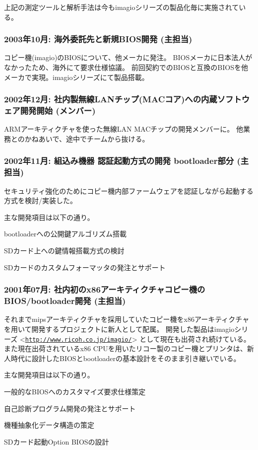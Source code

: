 \documentclass[letterpaper]{article}
\renewenvironment{itemize}{
  \begin{list}{}{
    \setlength{\leftmargin}{1.5em}
  }
}{
  \end{list}
}
\begin{document}
上記の測定ツールと解析手法は今もimagioシリーズの製品化毎に実施されている。

\subsubsection*{2003年10月: 海外委託先と新規BIOS開発 (主担当)}
コピー機(imagio)のBIOSについて、他メーカに発注。
BIOSメーカに日本法人がなかったため、海外にて要求仕様協議。
前回契約でのBIOSと互換のBIOSを他メーカで実現。imagioシリーズにて製品搭載。

\subsubsection*{2002年12月: 社内製無線LANチップ(MACコア)への内蔵ソフトウェア開発開始 (メンバー)}
ARMアーキティクチャを使った無線LAN MACチップの開発メンバーに。
他業務とのかねあいで、途中でチームから抜ける。

\subsubsection*{2002年11月: 組込み機器 認証起動方式の開発 bootloader部分 (主担当)}
セキュリティ強化のためにコピー機内部ファームウェアを認証しながら起動する方式を検討/実装した。

主な開発項目は以下の通り。
\begin{itemize}
  \item bootloaderへの公開鍵アルゴリズム搭載
  \item SDカード上への鍵情報搭載方式の検討
  \item SDカードのカスタムフォーマッタの発注とサポート
\end{itemize}

\subsubsection*{2001年07月: 社内初のx86アーキティクチャコピー機のBIOS/bootloader開発 (主担当)}
それまでmipsアーキティクチャを採用していたコピー機をx86アーキティクチャを用いて開発するプロジェクトに新人として配属。
開発した製品はimagioシリーズ <\href{http://www.ricoh.co.jp/imagio/}{\tt http://www.ricoh.co.jp/imagio/}> として現在も出荷され続けている。
また現在出荷されているx86 CPUを用いたリコー製のコピー機とプリンタは、新人時代に設計したBIOSとbootloaderの基本設計をそのまま引き継いでいる。

主な開発項目は以下の通り。
\begin{itemize}
  \item 一般的なBIOSへのカスタマイズ要求仕様策定
  \item 自己診断プログラム開発の発注とサポート
  \item 機種抽象化データ構造の策定
  \item SDカード起動Option BIOSの設計
\end{itemize}
\end{document}
